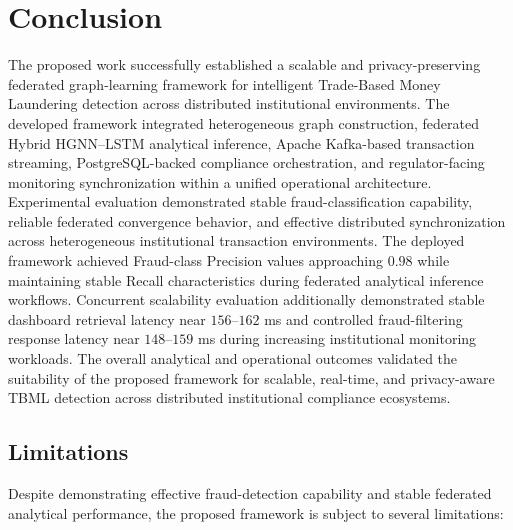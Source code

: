 \chapter{Conclusion}

The proposed work successfully established a scalable and privacy-preserving federated graph-learning framework for intelligent Trade-Based Money Laundering detection across distributed institutional environments. The developed framework integrated heterogeneous graph construction, federated Hybrid HGNN--LSTM analytical inference, Apache Kafka-based transaction streaming, PostgreSQL-backed compliance orchestration, and regulator-facing monitoring synchronization within a unified operational architecture. Experimental evaluation demonstrated stable fraud-classification capability, reliable federated convergence behavior, and effective distributed synchronization across heterogeneous institutional transaction environments. The deployed framework achieved Fraud-class Precision values approaching $0.98$ while maintaining stable Recall characteristics during federated analytical inference workflows. Concurrent scalability evaluation additionally demonstrated stable dashboard retrieval latency near $156$--$162$ ms and controlled fraud-filtering response latency near $148$--$159$ ms during increasing institutional monitoring workloads. The overall analytical and operational outcomes validated the suitability of the proposed framework for scalable, real-time, and privacy-aware TBML detection across distributed institutional compliance ecosystems.

\section{Limitations}

Despite demonstrating effective fraud-detection capability and stable federated analytical performance, the proposed framework is subject to several limitations:

